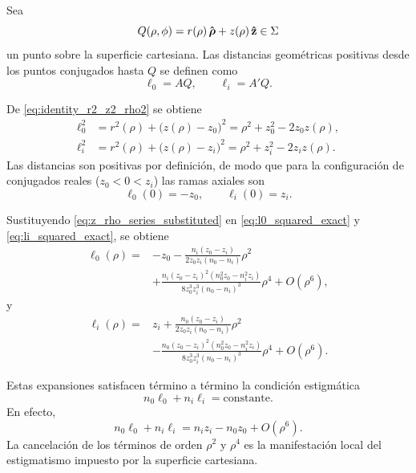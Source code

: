 Sea
\begin{equation}
Q(\rho,\phi)
=
r(\rho)\,\bm{\hat{\mathbf{\rho}}}
+
z(\rho)\,\bm{\hat{\mathbf{z}}}
\in\Sigma
\label{eq:surface_point_Q}
\end{equation}
un punto sobre la superficie cartesiana. Las distancias geométricas positivas desde los puntos conjugados hasta \(Q\) se definen como
\begin{equation}
\ell_0=AQ,
\qquad
\ell_i=A'Q.
\label{eq:geometrical_distances_l0_li}
\end{equation}

De \eqref{eq:identity_r2_z2_rho2} se obtiene
\begin{align}
\ell_0^2
&=
r^2(\rho)+\bigl(z(\rho)-z_0\bigr)^2
=
\rho^2+z_0^2-2z_0z(\rho),
\label{eq:l0_squared_exact}
\\[6pt]
\ell_i^2
&=
r^2(\rho)+\bigl(z(\rho)-z_i\bigr)^2
=
\rho^2+z_i^2-2z_iz(\rho).
\label{eq:li_squared_exact}
\end{align}
Las distancias son positivas por definición, de modo que para la
configuración de conjugados reales ($z_0<0<z_i$) las ramas axiales son
\begin{equation}
\ell_0(0)=-z_0,
\qquad
\ell_i(0)=z_i.
\label{eq:l0_li_axis_branches}
\end{equation}

Sustituyendo \eqref{eq:z_rho_series_substituted} en \eqref{eq:l0_squared_exact} y \eqref{eq:li_squared_exact}, se obtiene
\begin{align}
\ell_0(\rho)
=
{}&
-z_0
-
\frac{
n_i(z_0-z_i)
}{
2z_0z_i(n_0-n_i)
}
\rho^2
\nonumber
\\[4pt]
&
+
\frac{
n_i(z_0-z_i)^2
(n_0^2z_0-n_i^2z_i)
}{
8z_0^3z_i^3(n_0-n_i)^3
}
\rho^4
+
O(\rho^6),
\label{eq:l0_series_expansion}
\end{align}
y
\begin{align}
\ell_i(\rho)
=
{}&
z_i
+
\frac{
n_0(z_0-z_i)
}{
2z_0z_i(n_0-n_i)
}
\rho^2
\nonumber
\\[4pt]
&
-
\frac{
n_0(z_0-z_i)^2
(n_0^2z_0-n_i^2z_i)
}{
8z_0^3z_i^3(n_0-n_i)^3
}
\rho^4
+
O(\rho^6).
\label{eq:li_series_expansion}
\end{align}

Estas expansiones satisfacen término a término la condición estigmática
\begin{equation}
n_0\ell_0+n_i\ell_i
=
\text{constante}.
\label{eq:cartesian_optical_path_condition}
\end{equation}
En efecto,
\begin{equation}
n_0\ell_0+n_i\ell_i
=
n_iz_i-n_0z_0
+
O(\rho^6).
\label{eq:optical_path_constant_local}
\end{equation}
La cancelación de los términos de orden \(\rho^2\) y \(\rho^4\) es la manifestación local del estigmatismo impuesto por la superficie cartesiana.

